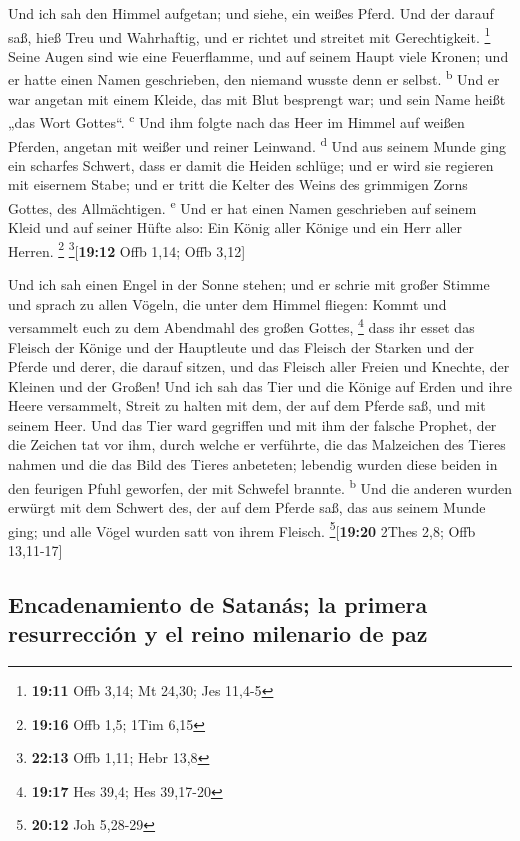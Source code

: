 Und ich sah den Himmel aufgetan; und siehe, ein weißes
Pferd. Und der darauf saß, hieß Treu und Wahrhaftig, und er richtet und
streitet mit Gerechtigkeit. \footnote{\textbf{19:11} Offb 3,14; Mt
  24,30; Jes 11,4-5}  Seine Augen sind wie eine
Feuerflamme, und auf seinem Haupt viele Kronen; und er hatte einen Namen
geschrieben, den niemand wusste denn er selbst. \textsuperscript{b}
 Und er war angetan mit einem Kleide, das mit Blut
besprengt war; und sein Name heißt „das Wort Gottes``.
\textsuperscript{c}  Und ihm folgte nach das Heer im
Himmel auf weißen Pferden, angetan mit weißer und reiner Leinwand.
\textsuperscript{d}  Und aus seinem Munde ging ein
scharfes Schwert, dass er damit die Heiden schlüge; und er wird sie
regieren mit eisernem Stabe; und er tritt die Kelter des Weins des
grimmigen Zorns Gottes, des Allmächtigen. \textsuperscript{e}
 Und er hat einen Namen geschrieben auf seinem Kleid und
auf seiner Hüfte also: Ein König aller Könige und ein Herr aller Herren.
\footnote{\textbf{19:16} Offb 1,5; 1Tim 6,15}
\footnote{\textbf{22:13} Offb 1,11; Hebr 13,8}{[}\textbf{19:12} Offb
1,14; Offb 3,12{]}

 Und ich sah einen Engel in der Sonne stehen; und er
schrie mit großer Stimme und sprach zu allen Vögeln, die unter dem
Himmel fliegen: Kommt und versammelt euch zu dem Abendmahl des großen
Gottes, \footnote{\textbf{19:17} Hes 39,4; Hes 39,17-20} 
dass ihr esset das Fleisch der Könige und der Hauptleute und das Fleisch
der Starken und der Pferde und derer, die darauf sitzen, und das Fleisch
aller Freien und Knechte, der Kleinen und der Großen! 
Und ich sah das Tier und die Könige auf Erden und ihre Heere versammelt,
Streit zu halten mit dem, der auf dem Pferde saß, und mit seinem Heer.
 Und das Tier ward gegriffen und mit ihm der falsche
Prophet, der die Zeichen tat vor ihm, durch welche er verführte, die das
Malzeichen des Tieres nahmen und die das Bild des Tieres anbeteten;
lebendig wurden diese beiden in den feurigen Pfuhl geworfen, der mit
Schwefel brannte. \textsuperscript{b}  Und die anderen
wurden erwürgt mit dem Schwert des, der auf dem Pferde saß, das aus
seinem Munde ging; und alle Vögel wurden satt von ihrem Fleisch.
\footnote{\textbf{20:12} Joh 5,28-29}{[}\textbf{19:20} 2Thes 2,8; Offb
13,11-17{]}

\hypertarget{encadenamiento-de-satanuxe1s-la-primera-resurrecciuxf3n-y-el-reino-milenario-de-paz}{%
\subsection{Encadenamiento de Satanás; la primera resurrección y el
reino milenario de
paz}\label{encadenamiento-de-satanuxe1s-la-primera-resurrecciuxf3n-y-el-reino-milenario-de-paz}}

